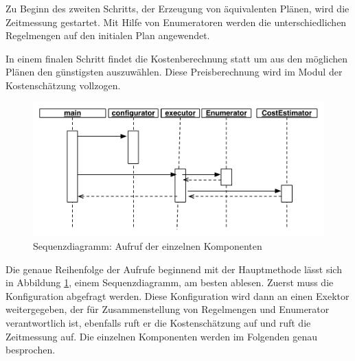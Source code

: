 Zu Beginn des zweiten Schritts, der Erzeugung von äquivalenten Plänen, wird die Zeitmessung gestartet.  Mit Hilfe von Enumeratoren werden die unterschiedlichen Regelmengen auf den initialen Plan angewendet.

In einem finalen Schritt findet die Kostenberechnung statt um aus den möglichen Plänen den günstigsten auszuwählen. Diese Preisberechnung wird im Modul der Kostenschätzung vollzogen.



\begin{figure}[ht]
  \centering
  \includegraphics[width=\textwidth]{04_Implementierung/00_media/SequenceDiagramConfiguration.pdf}
  \caption{Sequenzdiagramm: Aufruf der einzelnen Komponenten}
  \label{SequenceDiagramConfiguration}
\end{figure}


Die genaue Reihenfolge der Aufrufe beginnend mit der Hauptmethode lässt sich in Abbildung \ref{SequenceDiagramConfiguration}, einem Sequenzdiagramm, am besten ablesen. Zuerst muss die Konfiguration abgefragt werden. Diese Konfiguration wird dann an einen Exektor weitergegeben, der für Zusammenstellung von Regelmengen und Enumerator verantwortlich ist, ebenfalls ruft er die Kostenschätzung auf und ruft die Zeitmessung auf. Die einzelnen Komponenten werden im Folgenden genau besprochen.
